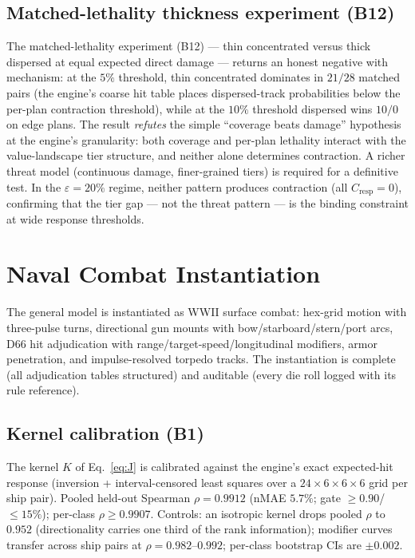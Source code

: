 \documentclass[12pt,a4paper]{article}
\begin{document}
\subsection{Matched-lethality thickness experiment (B12)}
The matched-lethality experiment (B12) --- thin concentrated versus
thick dispersed at equal expected direct damage --- returns an honest
negative with mechanism: at the $5\%$ threshold, thin concentrated
dominates in $21/28$ matched pairs (the engine's coarse hit table
places dispersed-track probabilities below the per-plan contraction
threshold), while at the $10\%$ threshold dispersed wins $10/0$ on
edge plans.  The result \emph{refutes} the simple ``coverage beats
damage'' hypothesis at the engine's granularity: both coverage and
per-plan lethality interact with the value-landscape tier structure,
and neither alone determines contraction.  A richer threat model
(continuous damage, finer-grained tiers) is required for a definitive
test.  In the $\varepsilon=20\%$ regime, neither pattern produces
contraction (all $C_{\text{resp}}=0$), confirming that the tier
gap --- not the threat pattern --- is the binding constraint at wide
response thresholds.

\section{Naval Combat Instantiation}\label{sec:naval}

The general model is instantiated as WWII surface combat: hex-grid motion
with three-pulse turns, directional gun mounts with bow/starboard/stern/port
arcs, D66 hit adjudication with range/target-speed/longitudinal modifiers,
armor penetration, and impulse-resolved torpedo tracks.  The instantiation
is complete (all adjudication tables structured) and auditable (every die
roll logged with its rule reference).

\subsection{Kernel calibration (B1)}
The kernel $K$ of Eq.~\eqref{eq:J} is calibrated against the engine's exact
expected-hit response (inversion + interval-censored least squares over a
$24\times6\times6\times6$ grid per ship pair).  Pooled held-out Spearman
$\rho=0.9912$ (nMAE $5.7\%$; gate $\ge0.90$/$\le15\%$); per-class
$\rho\ge0.9907$.  Controls: an isotropic kernel drops pooled $\rho$ to
$0.952$ (directionality carries one third of the rank information);
modifier curves transfer across ship pairs at $\rho=0.982$--$0.992$;
per-class bootstrap CIs are $\pm0.002$.
\end{document}
